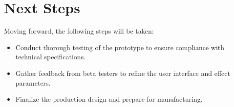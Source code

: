 \chapter{Next Steps}

Moving forward, the following steps will be taken:
\begin{itemize}
\item Conduct thorough testing of the prototype to ensure compliance with technical specifications.
\item Gather feedback from beta testers to refine the user interface and effect parameters.
\item Finalize the production design and prepare for manufacturing.
\end{itemize}
